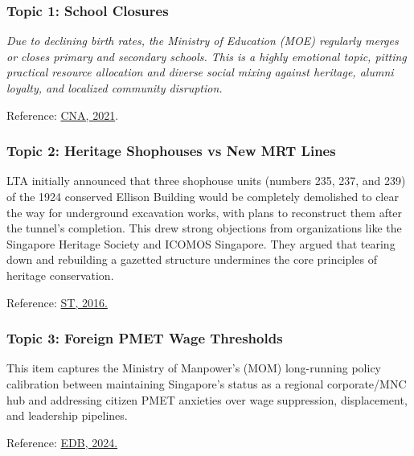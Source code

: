 \documentclass[titlepage]{article}
\begin{document}
\subsubsection{Topic 1: School Closures}
\begin{sidequote}
    \emph{Due to declining birth rates, the Ministry of Education (MOE) regularly merges or closes primary and secondary schools. This is a highly emotional topic, pitting practical resource allocation and diverse social mixing against heritage, alumni loyalty, and localized community disruption.}
\end{sidequote}

Reference: \href{https://www.channelnewsasia.com/singapore/nine-pairs-schools-merge-2022-amid-falling-birth-rates-changing-demographics-5650006}{CNA, 2021}.

\subsubsection{Topic 2: Heritage Shophouses vs New MRT Lines}
\begin{sidequote}
    LTA initially announced that three shophouse units (numbers 235, 237, and 239) of the 1924 conserved Ellison Building would be completely demolished to clear the way for underground excavation works, with plans to reconstruct them after the tunnel's completion. This drew strong objections from organizations like the Singapore Heritage Society and ICOMOS Singapore. They argued that tearing down and rebuilding a gazetted structure undermines the core principles of heritage conservation.
\end{sidequote}

Reference:
\href{https://www.straitstimes.com/singapore/tunnel-works-to-affect-heritage-building}{ST, 2016.}

\subsubsection{Topic 3: Foreign PMET Wage Thresholds}
\begin{sidequote}
    This item captures the Ministry of Manpower’s (MOM) long-running policy calibration between maintaining Singapore's status as a regional corporate/MNC hub and addressing citizen PMET anxieties over wage suppression, displacement, and leadership pipelines.
\end{sidequote}

Reference:
\href{https://www.edb.gov.sg/en/news-and-insights/salary-threshold-for-new-employment-pass-applicants-to-be-raised-to-5600-from-2025}{EDB, 2024.}
\end{document}
